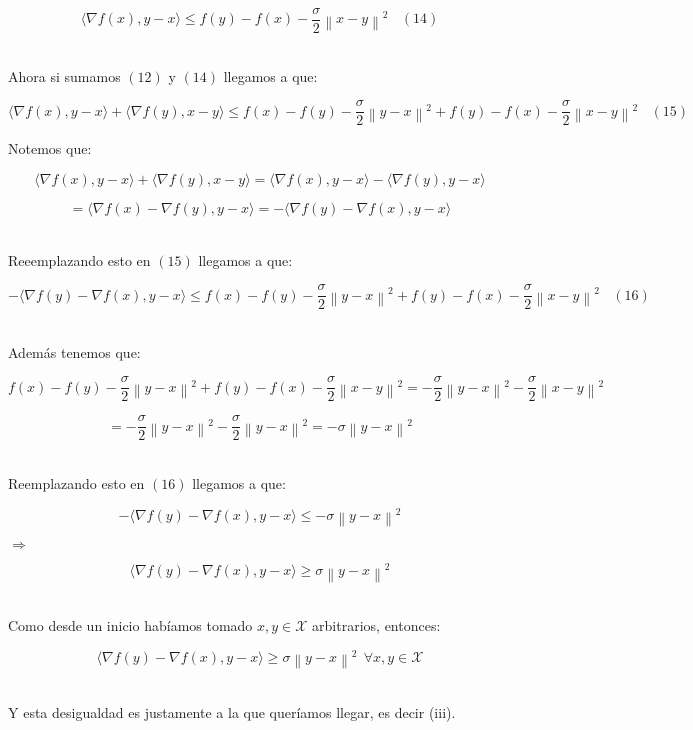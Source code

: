 \documentclass[11pt]{article}
\begin{document}
\[   \langle \nabla f(x), y-x \rangle \leq f(y)  -  f(x) - \frac{\sigma}{2} \left\| x-y \right\|^{2}   \ \ \ \ (14) \] \

\newpage

Ahora si sumamos $(12)$ y $(14)$ llegamos a que:

\[ \langle \nabla f(x), y-x \rangle + \langle \nabla f(y), x-y \rangle \leq f(x)  -  f(y) - \frac{\sigma}{2} \left\| y-x \right\|^{2} +  f(y)  -  f(x) - \frac{\sigma}{2} \left\| x-y \right\|^{2} \ \ \ \ (15) \]

Notemos que:

\[ \langle \nabla f(x), y-x \rangle + \langle \nabla f(y), x-y \rangle = \langle \nabla f(x), y-x \rangle - \langle  \nabla f(y), y-x \rangle \]

\[ = \langle \nabla f(x) - \nabla f(y), y-x \rangle = - \langle \nabla f(y) - \nabla f(x), y-x \rangle \] \

Reeemplazando esto en $(15)$ llegamos a que:

\[ - \langle \nabla f(y) - \nabla f(x), y-x \rangle \leq f(x)  -  f(y) - \frac{\sigma}{2} \left\| y-x \right\|^{2} +  f(y)  -  f(x) - \frac{\sigma}{2} \left\| x-y \right\|^{2} \ \ \ \ (16) \] \

Además tenemos que:

\[  f(x)  -  f(y) - \frac{\sigma}{2} \left\| y-x \right\|^{2} +  f(y)  -  f(x) - \frac{\sigma}{2} \left\| x-y \right\|^{2} = - \frac{\sigma}{2} \left\| y-x \right\|^{2} - \frac{\sigma}{2} \left\| x-y \right\|^{2}  \]

\[ = - \frac{\sigma}{2} \left\| y-x \right\|^{2} - \frac{\sigma}{2} \left\| y-x \right\|^{2} = - \sigma \left\| y-x \right\|^{2}  \] \

Reemplazando esto en $(16)$ llegamos a que:

\[ - \langle \nabla f(y) - \nabla f(x), y-x \rangle \leq - \sigma \left\| y-x \right\|^{2} \] 

$ \Rightarrow $ 

\[  \langle \nabla f(y) - \nabla f(x), y-x \rangle \geq  \sigma \left\| y-x \right\|^{2} \] \

Como desde un inicio habíamos tomado $x,y \in \mathcal{X}$ arbitrarios, entonces:

\[  \langle \nabla f(y) - \nabla f(x), y-x \rangle \geq  \sigma \left\| y-x \right\|^{2} \ \ \forall x,y \in \mathcal{X} \]  \

Y esta desigualdad es justamente a la que queríamos llegar, es decir (iii). \\
\end{document}
